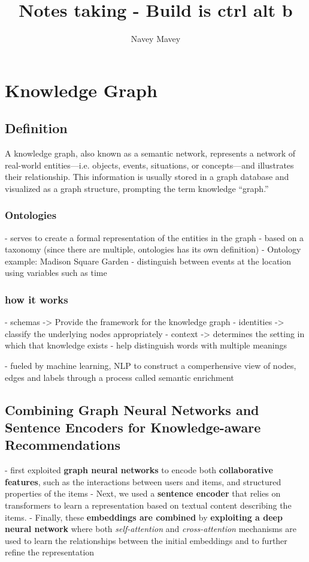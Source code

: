 \documentclass{report}
\title{Notes taking - Build is ctrl alt b}
\author{Navey Mavey}
\begin{document}
\maketitle
\chapter{Knowledge Graph}

\section{Definition}

A knowledge graph, also known as a semantic network, represents a network of real-world entities—i.e. objects, events, situations, or concepts—and illustrates their relationship. This information is usually stored in a graph database and visualized as a graph structure, prompting the term knowledge “graph.”

\subsection{Ontologies}
- serves to create a formal representation of the entities in the graph
- based on a taxonomy (since there are multiple, ontologies has its own definition)
- Ontology example: Madison Square Garden
    - distinguish between events at the location using variables such as time

\subsection{how it works}
- schemas -> Provide the framework for the knowledge graph
- identities -> classify the underlying nodes appropriately
- context -> determines the setting in which that knowledge exists
    - help distinguish words with multiple meanings

- fueled by machine learning, NLP to construct a comperhensive view of nodes, edges and labels through a process called semantic enrichment



\section{Combining Graph Neural Networks and Sentence Encoders for Knowledge-aware Recommendations}
- first exploited\textbf{ graph neural networks} to encode both \textbf{collaborative features}, such as the interactions between users and items, and structured properties of the items
- Next, we used a\textbf{ sentence encoder} that relies on transformers to learn a representation based on textual content describing the items. 
- Finally, these \textbf{embeddings are combined }by \textbf{exploiting a deep neural network }where both \textit{self-attention }and\textit{ cross-attention} mechanisms are used to learn the
relationships between the initial embeddings and to further refine
the representation
\end{document}
